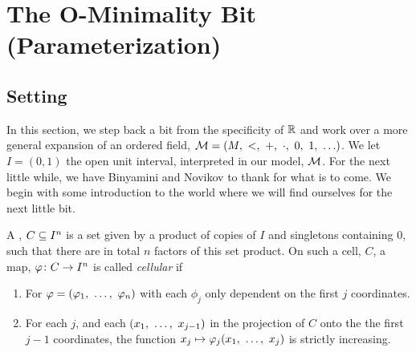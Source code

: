 %
%
%
\chapter{The O-Minimality Bit (Parameterization)}
\label{chap:om_bit} %



\bigskip

\section{Setting}

In this section, we step back a bit from the specificity of $\R$ and work over a more general \om expansion of an ordered field, $\M = \Mltarithplus$. We let $I = (0, 1)$ the open unit interval, interpreted in our model, $\M$. For the next little while, we have Binyamini and Novikov \cite{binyamini_yomdingromov_2021} to thank for what is to come. We begin with some introduction to the world where we will find ourselves for the next little bit.

\begin{definition}
  A \emph{\bc}, $\CIn[C]{n}$ is a set given by a product of copies of $I$ and singletons containing $0$, such that there are in total $n$ factors of this set product. On such a cell, $C$, a \cont map, $\funcdom{\phi}{C}{I^n}$ is called \emph{cellular} if
    \begin{enumerate}
      \item For $\phi = (\vonevm{\phi}{n})$ with each $\phi_j$ only dependent on the first $j$ coordinates.

      \item For each $j$, and each $(\vonevm{x}{j - 1})$ in the projection of $C$ onto the the first $j - 1$ coordinates, the function $x_j \mapsto \phi_j(\vonevm{x}{j})$ is strictly increasing.
    \end{enumerate}

\end{definition}

